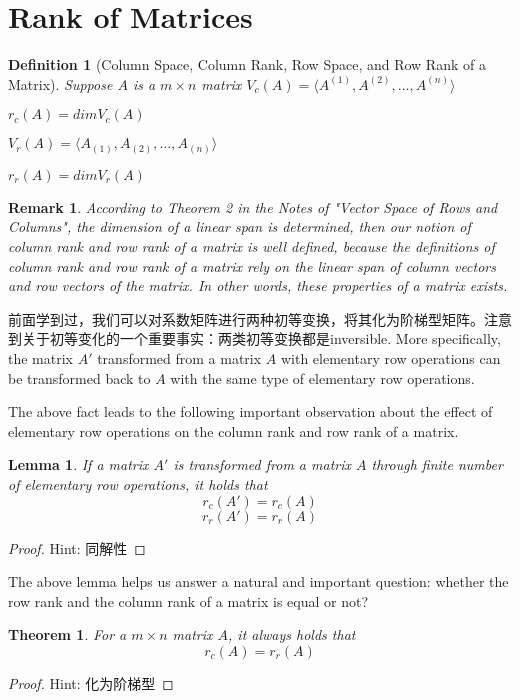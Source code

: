 \documentclass[onecolumn]{ctexart}
\newtheorem{definition}{Definition}
\newtheorem{theorem}{Theorem}
\newtheorem{lemma}{Lemma}
\newtheorem{remark}{Remark}
\begin{document}
\section{Rank of Matrices}
\begin{definition}[Column Space, Column Rank, Row Space, and Row Rank of a Matrix]
  Suppose $A$ is a $m \times n$ matrix
  $V_c(A) = \langle A^{(1)}, A^{(2)}, \ldots, A^{(n)}\rangle$

  $r_c(A) = dim V_c(A)$

  $V_r(A) = \langle A_{(1)}, A_{(2)}, \ldots, A_{(n)}\rangle $

  $r_r(A) = dim V_r(A)$
\end{definition}
\begin{remark}
  According to Theorem 2 in the Notes of "Vector Space of Rows and Columns", the 
  dimension of a linear span is determined, then our notion of column rank and 
  row rank of a matrix is well defined, because the definitions of column rank 
  and row rank of a matrix rely on the linear span of column vectors and row 
  vectors of the matrix. In other words, these properties of a 
  matrix exists.
\end{remark}

前面学到过，我们可以对系数矩阵进行两种初等变换，将其化为阶梯型矩阵。注意到关于初等变化的一个重要事实：两类初等变换都是inversible. More 
specifically, the matrix $A'$ transformed from a matrix $A$ with elementary row 
operations can be transformed back to $A$ with the same type of elementary row 
operations.

The above fact leads to the following important observation about the effect of 
elementary row operations on the column rank and row rank of a matrix.
\begin{lemma}
  If a matrix $A'$ is transformed from a matrix $A$ through finite number of 
  elementary row operations, it holds that
  \[
    r_c(A') = r_c(A)
  \]
  \[
    r_r(A') = r_r(A)
  \]
\end{lemma}
\begin{proof}
  Hint: 同解性
\end{proof}

The above lemma helps us answer a natural and important question: whether the 
row rank and the column rank of a matrix is equal or not?
\begin{theorem}
  For a $m \times n$ matrix $A$, it always holds that
  \[
    r_c(A) = r_r(A)
  \]
\end{theorem}
\begin{proof}
  Hint: 化为阶梯型
\end{proof}
\end{document}
